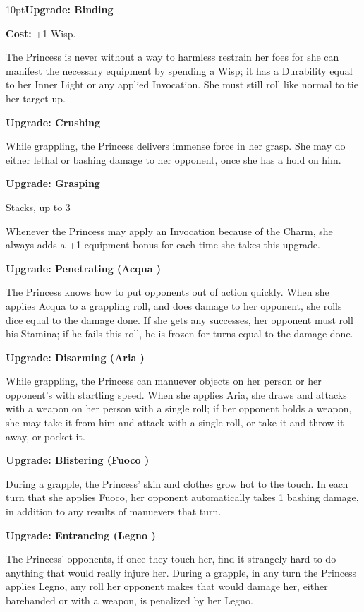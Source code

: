 \begin{myindentpar}{10pt}\textbf{Upgrade: Binding}

\textbf{Cost:} +1 Wisp. 

The Princess is never without a way to harmless restrain her foes for she can manifest the necessary equipment by spending a Wisp; it has a Durability equal to her Inner Light or any applied Invocation. She must still roll like normal to tie her target up. 

\textbf{Upgrade: Crushing}

While grappling, the Princess delivers immense force in her grasp. She may do either lethal or bashing damage to her opponent, once she has a hold on him.

\textbf{Upgrade: Grasping}

Stacks, up to 3

Whenever the Princess may apply an Invocation because of the Charm, she always adds a +1 equipment bonus for each time she takes this upgrade.

\textbf{Upgrade: Penetrating (Acqua \textbullet\textbullet)}

The Princess knows how to put opponents out of action quickly. When she applies Acqua to a grappling roll, and does damage to her opponent, she rolls dice equal to the damage done. If she gets any successes, her opponent must roll his Stamina; if he fails this roll, he is frozen for turns equal to the damage done.

\textbf{Upgrade: Disarming (Aria \textbullet\textbullet)}

While grappling, the Princess can manuever objects on her person or her opponent's with startling speed. When she applies Aria, she draws and attacks with a weapon on her person with a single roll; if her opponent holds a weapon, she may take it from him and attack with a single roll, or take it and throw it away, or pocket it.

\textbf{Upgrade: Blistering (Fuoco \textbullet\textbullet)}

During a grapple, the Princess' skin and clothes grow hot to the touch. In each turn that she applies Fuoco, her opponent automatically takes 1 bashing damage, in addition to any results of manuevers that turn.

\textbf{Upgrade: Entrancing (Legno \textbullet\textbullet)}

The Princess' opponents, if once they touch her, find it strangely hard to do anything that would really injure her. During a grapple, in any turn the Princess applies Legno, any roll her opponent makes that would damage her, either barehanded or with a weapon, is penalized by her Legno.


\end{myindentpar}
